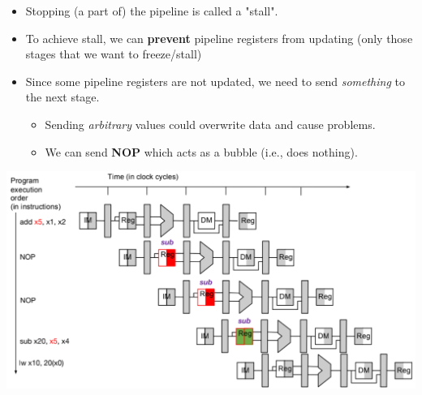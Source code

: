 \documentclass[10pt]{article}
\begin{document}
\begin{itemize}
    \item Stopping (a part of) the pipeline is called a "stall".
    \item To achieve stall, we can \textbf{prevent} pipeline registers from updating (only those stages that we want to freeze/stall)
    \item Since some pipeline registers are not updated, we need to send \textit{something} to the next stage.
    \begin{itemize}
        \item Sending \textit{arbitrary} values could overwrite data and cause problems.
        \item We can send \textbf{NOP} which acts as a bubble (i.e., does nothing).
    \end{itemize}
\end{itemize}
\begin{center}
    \includegraphics*[scale=0.4]{W3_10.png}
\end{center}
\end{document}
